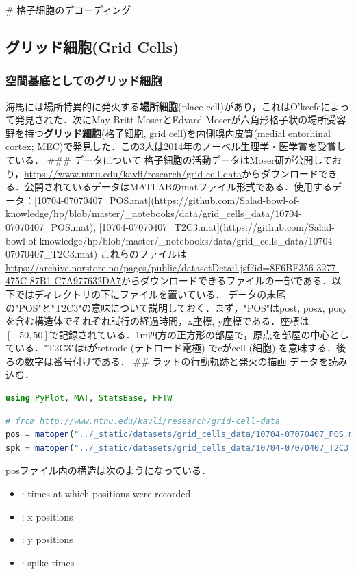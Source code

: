 # 格子細胞のデコーディング
\subsection{グリッド細胞(Grid Cells)}
\subsubsection{空間基底としてのグリッド細胞}
海馬には場所特異的に発火する\textbf{場所細胞}(place cell)があり，これはO'keefeによって発見された．次にMay-Britt MoserとEdvard Moserが六角形格子状の場所受容野を持つ\textbf{グリッド細胞}(格子細胞, grid cell)を内側嗅内皮質(medial entorhinal cortex; MEC)で発見した．この3人は2014年のノーベル生理学・医学賞を受賞している．
### データについて
格子細胞の活動データはMoser研が公開しており，\url{https://www.ntnu.edu/kavli/research/grid-cell-data}からダウンロードできる．公開されているデータはMATLABのmatファイル形式である．使用するデータ：[10704-07070407_POS.mat](https://github.com/Salad-bowl-of-knowledge/hp/blob/master/_notebooks/data/grid_cells_data/10704-07070407_POS.mat), [10704-07070407_T2C3.mat](https://github.com/Salad-bowl-of-knowledge/hp/blob/master/_notebooks/data/grid_cells_data/10704-07070407_T2C3.mat)
これらのファイルは\url{https://archive.norstore.no/pages/public/datasetDetail.jsf?id=8F6BE356-3277-475C-87B1-C7A977632DA7}からダウンロードできるファイルの一部である．以下ではディレクトリの下にファイルを置いている．
データの末尾の"POS"と"T2C3"の意味について説明しておく．まず，"POS"はpost, posx, posyを含む構造体でそれぞれ試行の経過時間，x座標, y座標である．座標は$[-50, 50]$で記録されている．1m四方の正方形の部屋で，原点を部屋の中心としている．"T2C3"はtがtetrode (テトロード電極) でcがcell (細胞) を意味する．後ろの数字は番号付けである． 
## ラットの行動軌跡と発火の描画
データを読み込む．
\begin{lstlisting}[language=julia]
using PyPlot, MAT, StatsBase, FFTW
\end{lstlisting}
\begin{lstlisting}[language=julia]
# from http://www.ntnu.edu/kavli/research/grid-cell-data
pos = matopen("../_static/datasets/grid_cells_data/10704-07070407_POS.mat")
spk = matopen("../_static/datasets/grid_cells_data/10704-07070407_T2C3.mat")
\end{lstlisting}
posファイル内の構造は次のようになっている．
\begin{itemize}
\item {}: times at which positions were recorded
\item {}: x positions
\item {}: y positions
\item {}: spike times
\end{itemize}
